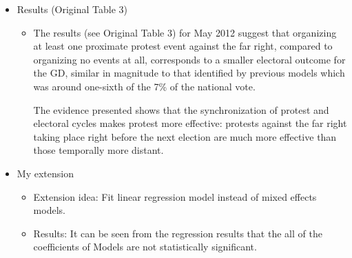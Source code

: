 \documentclass[12pt,letterpaper]{article}
\begin{document}
\begin{itemize}
\begin{itemize}
	\end{itemize}
	\item
	Results  (Original Table 3)
	\begin{itemize}
		\item 
		The results (see Original Table 3) for May 2012 suggest that organizing at least one proximate protest event against the far right, compared to organizing no events at all, corresponds to a smaller electoral outcome for the GD, similar in magnitude to that identified by previous models which was around one-sixth of the 7\% of the national vote.
		
		The evidence presented shows that the synchronization of protest and electoral cycles makes protest more effective: protests against the far right taking place right before the next election are much more effective than those temporally more distant.
	\end{itemize}
	\item
	My extension
	\begin{itemize}
		\item
		Extension idea: Fit linear regression model instead of mixed effects models.
	\end{itemize}
	
	\begin{itemize}
		\item Results: It can be seen from the regression results that the all of the coefficients of Models are not statistically significant.
	\end{itemize}
	
\end{itemize}    
\end{document}

